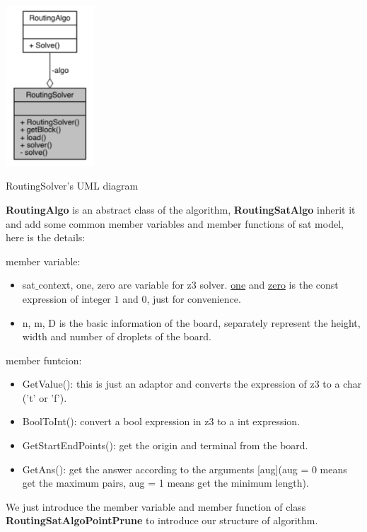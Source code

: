 \documentclass[twocolumn]{article}
\begin{document}
\begin{center}
\makeatletter
\def\@captype{figure}
\makeatother
\includegraphics [height=6cm]{UMLRoutingSolver}
\caption{RoutingSolver's UML diagram}
\label{UMLRoutingSolver}
\end{center}

\textbf{RoutingAlgo} is an abstract class of the algorithm, \textbf{RoutingSatAlgo} inherit it and add some common member variables and member functions of sat model, here is the details:

member variable:

\begin{itemize}
    \item sat$\_$context, one, zero are variable for z3 solver. \underline{one} and \underline{zero} is the const expression of integer $1$ and $0$, just for convenience.
    \item n, m, D is the basic information of the board, separately represent the height, width and number of droplets of the board.
\end{itemize}

member funtcion:

\begin{itemize}
    \item GetValue(): this is just an adaptor and converts the expression of z3 to a char ('t' or 'f').
    \item BoolToInt(): convert a bool expression in z3 to a int expression.
    \item GetStartEndPoints(): get the origin and terminal from the board.
    \item GetAns(): get the answer according to the arguments [aug](aug = 0 means get the maximum pairs, aug = 1 means get the minimum length).
\end{itemize}

We just introduce the member variable and member function of class \textbf{RoutingSatAlgoPointPrune} to introduce our structure of algorithm.
\end{document}

